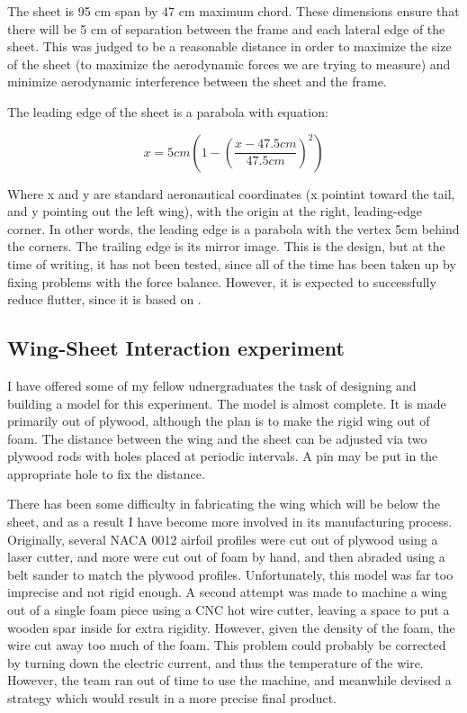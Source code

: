 \documentclass[12pt]{report} %
\begin{document}
The sheet is 95 cm span by 47 cm maximum chord. These dimensions ensure that there will be 5 cm of separation between the frame and each
lateral edge of the sheet. This was judged to be a reasonable distance in order to maximize the size of the sheet (to maximize the aerodynamic
forces we are trying to measure) and minimize aerodynamic interference between the sheet and the frame.

The leading edge of the sheet is a parabola with equation:

\[ x = 5cm(1-(\frac{x-47.5cm}{47.5cm})^2) \]

Where x and y are standard aeronautical coordinates (x pointint toward the tail, and y pointing out the left wing), with the origin at the right,
leading-edge corner. In other words, the leading edge is a parabola with the vertex 5cm behind the corners. The trailing edge is its mirror image.
This is the design, but at the time of writing, it has not been tested, since all of the time has been taken up by fixing problems with the force
balance. However, it is expected to successfully reduce flutter, since it is based on \cite{us}.

\subsection{Wing-Sheet Interaction experiment}
I have offered some of my fellow udnergraduates the task of designing and building a model for this experiment.
The model is almost complete. It is made
primarily out of plywood, although the plan is to make the rigid wing out of foam. The distance between the wing and the sheet can be adjusted
via two plywood rods with holes placed at periodic intervals. A pin may be put in the appropriate hole to fix the distance.

There has been some difficulty in fabricating the wing which will be below the sheet, and as a result I have become more involved in its
manufacturing process. Originally, several NACA 0012 airfoil profiles were cut out of
plywood using a laser cutter, and more were cut out of foam by hand, and then abraded using a belt sander to match the plywood profiles.
Unfortunately, this model was far too imprecise and not rigid enough. A second attempt was made to machine a wing out of a single foam piece
using a CNC hot wire cutter, leaving a space to put a wooden spar inside for extra rigidity. However, given the density of the foam, the
wire cut away too much of the foam. This problem could probably be corrected by turning down the electric current, and thus the temperature
of the wire. However, the team ran out of time to use the machine, and meanwhile devised a strategy which would result in a more precise final
product.
\end{document}
